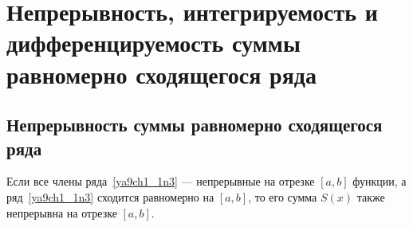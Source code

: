 \section{Непрерывность, интегрируемость и дифференцируемость суммы равномерно сходящегося ряда}

\subsection{Непрерывность суммы равномерно сходящегося ряда}

\begin{thm}
	\label{ch12:th:continuity}
	Если все члены ряда~\eqref{ya9ch1_1n3} --- непрерывные на отрезке $[a, b]$ функции,
	а ряд~\eqref{ya9ch1_1n3} сходится равномерно на $[a, b]$, то его сумма $S(x)$
	также непрерывна на отрезке $[a, b]$.
\end{thm}
